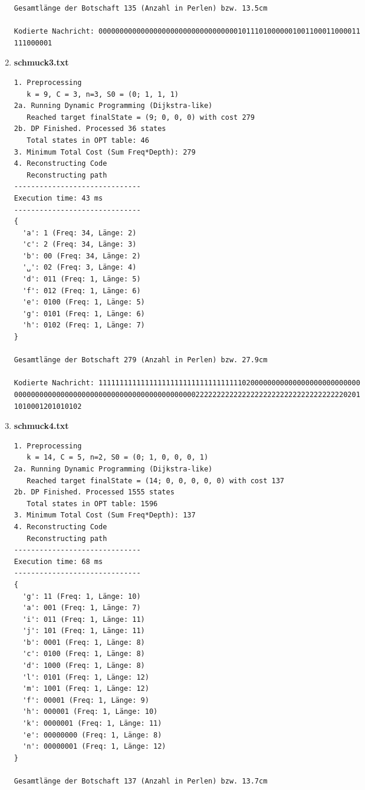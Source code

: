 \documentclass[a4paper,10pt,ngerman]{scrartcl}
\begin{document}
\begin{enumerate}
\begin{verbatim}
Gesamtlänge der Botschaft 135 (Anzahl in Perlen) bzw. 13.5cm

Kodierte Nachricht: 00000000000000000000000000000000010111010000001001100011000011
111000001
  \end{verbatim}
  \item \textbf{schmuck3.txt}
  \begin{verbatim}
1. Preprocessing
   k = 9, C = 3, n=3, S0 = (0; 1, 1, 1)
2a. Running Dynamic Programming (Dijkstra-like)
   Reached target finalState = (9; 0, 0, 0) with cost 279
2b. DP Finished. Processed 36 states
   Total states in OPT table: 46
3. Minimum Total Cost (Sum Freq*Depth): 279
4. Reconstructing Code
   Reconstructing path
------------------------------
Execution time: 43 ms
------------------------------
{
  'a': 1 (Freq: 34, Länge: 2)
  'c': 2 (Freq: 34, Länge: 3)
  'b': 00 (Freq: 34, Länge: 2)
  '␣': 02 (Freq: 3, Länge: 4)
  'd': 011 (Freq: 1, Länge: 5)
  'f': 012 (Freq: 1, Länge: 6)
  'e': 0100 (Freq: 1, Länge: 5)
  'g': 0101 (Freq: 1, Länge: 6)
  'h': 0102 (Freq: 1, Länge: 7)
}

Gesamtlänge der Botschaft 279 (Anzahl in Perlen) bzw. 27.9cm

Kodierte Nachricht: 11111111111111111111111111111111110200000000000000000000000000
0000000000000000000000000000000000000000000222222222222222222222222222222222220201
1010001201010102
  \end{verbatim}
  \item \textbf{schmuck4.txt}
  \begin{verbatim}
1. Preprocessing
   k = 14, C = 5, n=2, S0 = (0; 1, 0, 0, 0, 1)
2a. Running Dynamic Programming (Dijkstra-like)
   Reached target finalState = (14; 0, 0, 0, 0, 0) with cost 137
2b. DP Finished. Processed 1555 states
   Total states in OPT table: 1596
3. Minimum Total Cost (Sum Freq*Depth): 137
4. Reconstructing Code
   Reconstructing path
------------------------------
Execution time: 68 ms
------------------------------
{
  'g': 11 (Freq: 1, Länge: 10)
  'a': 001 (Freq: 1, Länge: 7)
  'i': 011 (Freq: 1, Länge: 11)
  'j': 101 (Freq: 1, Länge: 11)
  'b': 0001 (Freq: 1, Länge: 8)
  'c': 0100 (Freq: 1, Länge: 8)
  'd': 1000 (Freq: 1, Länge: 8)
  'l': 0101 (Freq: 1, Länge: 12)
  'm': 1001 (Freq: 1, Länge: 12)
  'f': 00001 (Freq: 1, Länge: 9)
  'h': 000001 (Freq: 1, Länge: 10)
  'k': 0000001 (Freq: 1, Länge: 11)
  'e': 00000000 (Freq: 1, Länge: 8)
  'n': 00000001 (Freq: 1, Länge: 12)
}

Gesamtlänge der Botschaft 137 (Anzahl in Perlen) bzw. 13.7cm


\end{verbatim}
\end{enumerate}
\end{document}
